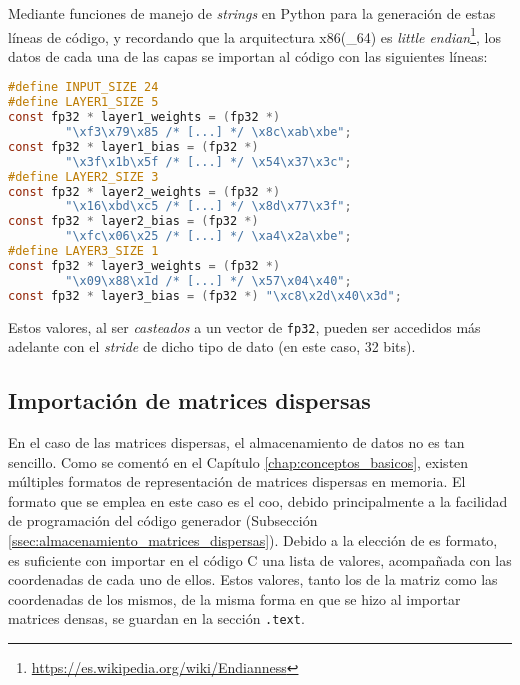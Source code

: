 Mediante funciones de manejo de \textit{strings} en Python para la generación de estas líneas de código, y recordando que la arquitectura x86(\_64) es \textit{little endian}\footnote{\url{https://es.wikipedia.org/wiki/Endianness}}, los datos de cada una de las capas se importan al código con las siguientes líneas:\medskip
\begin{lstlisting}[language=C]
#define INPUT_SIZE 24
#define LAYER1_SIZE 5
const fp32 * layer1_weights = (fp32 *)
        "\xf3\x79\x85 /* [...] */ \x8c\xab\xbe";
const fp32 * layer1_bias = (fp32 *)
        "\x3f\x1b\x5f /* [...] */ \x54\x37\x3c";
#define LAYER2_SIZE 3
const fp32 * layer2_weights = (fp32 *)
        "\x16\xbd\xc5 /* [...] */ \x8d\x77\x3f";
const fp32 * layer2_bias = (fp32 *)
        "\xfc\x06\x25 /* [...] */ \xa4\x2a\xbe";
#define LAYER3_SIZE 1
const fp32 * layer3_weights = (fp32 *)
        "\x09\x88\x1d /* [...] */ \x57\x04\x40";
const fp32 * layer3_bias = (fp32 *) "\xc8\x2d\x40\x3d";
\end{lstlisting}

Estos valores, al ser \textit{casteados} a un vector de \texttt{fp32}, pueden ser accedidos más adelante con el \textit{stride} de dicho tipo de dato (en este caso, 32 bits).

\subsection{Importación de matrices dispersas}
\label{ssec:importacion_matrices_dispersas}
En el caso de las matrices dispersas, el almacenamiento de datos no es tan sencillo. Como se comentó en el Capítulo \ref{chap:conceptos_basicos}, existen múltiples formatos de representación de matrices dispersas en memoria. El formato que se emplea en este caso es el \acrshort{coo}, debido principalmente a la facilidad de programación del código generador (Subsección \ref{ssec:almacenamiento_matrices_dispersas}). Debido a la elección de es formato, es suficiente con importar en el código C una lista de valores, acompañada con las coordenadas de cada uno de ellos. Estos valores, tanto los de la matriz como las coordenadas de los mismos, de la misma forma en que se hizo al importar matrices densas, se guardan en la sección \texttt{.text}.

